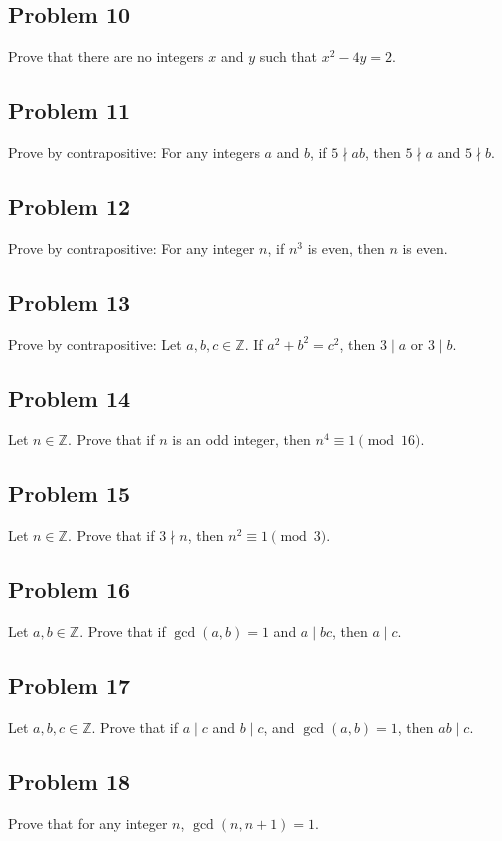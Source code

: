 \documentclass[12pt]{article}
\begin{document}
\subsection{Problem 10}
Prove that there are no integers $x$ and $y$ such that $x^2 - 4y = 2$.

\subsection{Problem 11}
Prove by contrapositive: For any integers $a$ and $b$, if $5 \nmid ab$, then $5 \nmid a$ and $5 \nmid b$.

\subsection{Problem 12}
Prove by contrapositive: For any integer $n$, if $n^3$ is even, then $n$ is even.

\subsection{Problem 13}
Prove by contrapositive: Let $a, b, c \in \mathbb{Z}$. If $a^2 + b^2 = c^2$, then $3 \mid a$ or $3 \mid b$.

\subsection{Problem 14}
Let $n \in \mathbb{Z}$. Prove that if $n$ is an odd integer, then $n^4 \equiv 1 \pmod{16}$.

\subsection{Problem 15}
Let $n \in \mathbb{Z}$. Prove that if $3 \nmid n$, then $n^2 \equiv 1 \pmod 3$.

\subsection{Problem 16}
Let $a, b \in \mathbb{Z}$. Prove that if $\gcd(a, b) = 1$ and $a \mid bc$, then $a \mid c$.

\subsection{Problem 17}
Let $a, b, c \in \mathbb{Z}$. Prove that if $a \mid c$ and $b \mid c$, and $\gcd(a, b) = 1$, then $ab \mid c$.

\subsection{Problem 18}
Prove that for any integer $n$, $\gcd(n, n+1) = 1$.
\end{document}
